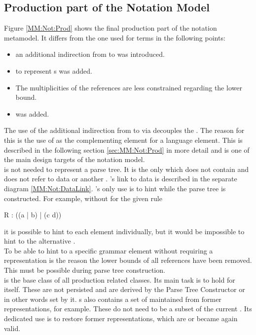 \subsection{Production part of the Notation Model}
Figure \ref{MM:Not:Prod} shows the final production part of the notation metamodel. It differs from the one used for terms in the following points:
\begin{itemize}
	\item an additional indirection from  to  was introduced. 
	\item {} to represent s was added.
	\item The multiplicities of the references are less constrained regarding the lower bound.
	\item {} was added.
\end{itemize}
The use of the additional indirection from  to  via  decouples the . The reason for this is the use of  as the complementing element for a language element. This is described in the following section \ref{sec:MM:Not:Prod} in more detail and is one of the main design targets of the notation model.\\
 is not needed to represent a parse tree. It is the only  which does not contain and does not refer to data or another . 's link to data is described in the separate diagram \ref{MM:Not:DataLink}. 's only use is to hint while the parse tree is constructed. For example, without  for the given rule
\begin{xtxt}
R : ((a | b) | (c d)) 
\end{xtxt}
it is possible to hint to each element individually, but it would be impossible to hint to the alternative . \\
To be able to hint to a specific grammar element without requiring a representation is the reason the lower bounds of all references have been removed. This must be possible during parse tree construction.\\
 is the base class of all production related classes. Its main task is to hold  for itself. These  are not persisted and are derived by the Parse Tree Constructor or in other words set by it. s also contains a set of  maintained from former representations, for example. These do not need to be a subset of the current . Its dedicated use is to restore former representations, which are or became again valid.

